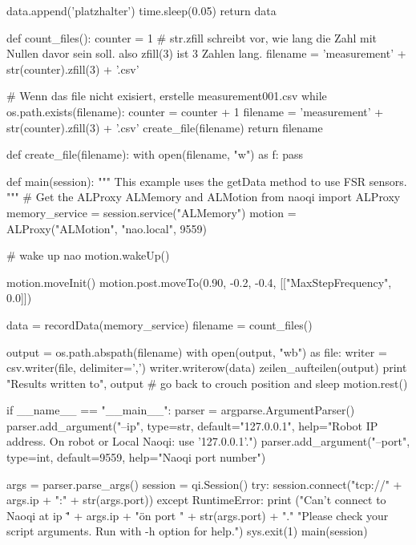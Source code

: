 \begin{python} [caption={Pythonprogramm für Messaufnahmen}, label=Messungscode]
				data.append('platzhalter')
				time.sleep(0.05)
			return data
		
		
		def count_files():
			counter = 1
			# str.zfill schreibt vor, wie lang die Zahl mit Nullen davor sein soll. also zfill(3) ist 3 Zahlen lang.
			filename = 'measurement' + str(counter).zfill(3) + '.csv'
			
			# Wenn das file nicht exisiert, erstelle measurement001.csv
			while os.path.exists(filename):
				counter = counter + 1
				filename = 'measurement' + str(counter).zfill(3) + '.csv'
			create_file(filename)
			return filename
		
		
		def create_file(filename):
			with open(filename, "w") as f:
				pass
		
		
		def main(session):
			"""
			This example uses the getData method to use FSR sensors.
			"""
			# Get the ALProxy ALMemory and ALMotion
			from naoqi import ALProxy
			memory_service = session.service("ALMemory")
			motion = ALProxy("ALMotion", "nao.local", 9559)
			
			# wake up nao
			motion.wakeUp()
			
			motion.moveInit()
			motion.post.moveTo(0.90, -0.2, -0.4, [["MaxStepFrequency", 0.0]])
			
			data = recordData(memory_service)
			filename = count_files()
			
			output = os.path.abspath(filename)
			with open(output, "wb") as file:
				writer = csv.writer(file, delimiter=',')
				writer.writerow(data)
			zeilen_aufteilen(output)
			print "Results written to", output
			# go back to crouch position and sleep
			motion.rest()
			
		
		if __name__ == "__main__":
			parser = argparse.ArgumentParser()
			parser.add_argument("--ip", type=str, default="127.0.0.1",
			help="Robot IP address. On robot or Local Naoqi: use '127.0.0.1'.")
			parser.add_argument("--port", type=int, default=9559,
			help="Naoqi port number")
			
			args = parser.parse_args()
			session = qi.Session()
			try:
				session.connect("tcp://" + args.ip + ":" + str(args.port))
			except RuntimeError:
				print ("Can't connect to Naoqi at ip \"" + args.ip + "\" on port " + str(args.port) + ".\n"
				"Please check your script arguments. Run with -h option for help.")
			sys.exit(1)
			main(session)	
	\end{python}
